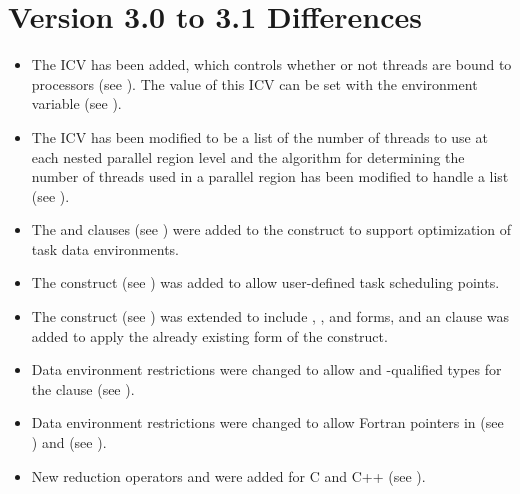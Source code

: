 \section{Version 3.0 to 3.1 Differences}
\label{sec:Version 3.0 to 3.1 Differences}
\begin{itemize}
\item The  ICV has been added, which controls whether or not 
      threads are bound to processors (see ).
      The value of this ICV can be set with the  environment 
      variable (see ).

\item The  ICV has been modified to be a list of the number 
      of threads to use at each nested parallel region level and the algorithm for 
      determining the number of threads used in a parallel region has been modified 
      to handle a list (see 
      ).

\item The  and  clauses 
      (see ) were added to the  
      construct to support optimization of task data environments.

\item The  construct (see ) 
      was added to allow user-defined task scheduling points.

\item The  construct (see ) was 
      extended to include , , and  forms, 
      and an  clause was added to apply the already existing form 
      of the  construct.

\item Data environment restrictions were changed to allow  and
      -qualified types for the  clause 
      (see ).

\item Data environment restrictions were changed to allow Fortran pointers in
       (see ) and 
       (see ).

\item New reduction operators  and  were added for C and 
      C++ (see ).


\end{itemize}
